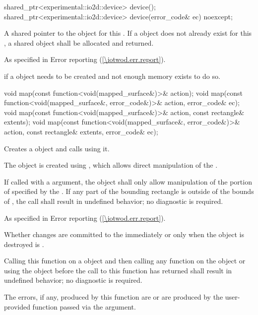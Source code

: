 \begin{itemdecl}
shared_ptr<experimental::io2d::device> device();
shared_ptr<experimental::io2d::device> device(error_code& ec) noexcept;
\end{itemdecl}
\begin{itemdescr}
\pnum
\returns
A shared pointer to the  object for this . If a  object does not already exist for this , a shared  object shall be allocated and returned.

\pnum
\throws
As specified in Error reporting (\ref{\iotwod.err.report}).

\pnum
\errors
{} if a  object needs to be created and not enough memory exists to do so.
\end{itemdescr}

\begin{itemdecl}
void map(const function<void(mapped_surface&)>& action);
void map(const function<void(mapped_surface&, error_code&)>& action, error_code& ec);
void map(const function<void(mapped_surface&)>& action, const rectangle& extents);
void map(const function<void(mapped_surface&, error_code&)>& action,
  const rectangle& extents, error_code& ec);
\end{itemdecl}
\begin{itemdescr}
\pnum
\effects
Creates a  object and calls  using it.

\pnum
The  object is created using , which allows direct manipulation of the \underlyingsurface.

\pnum
If called with a  argument, the  object shall only allow manipulation of the portion of  specified by the  . If any part of the bounding rectangle is outside of the bounds of , the call shall result in undefined behavior; no diagnostic is required.

\pnum
\throws
As specified in Error reporting (\ref{\iotwod.err.report}).

\pnum
\remarks
Whether changes are committed to the \underlyingsurface immediately or only when the  object is destroyed is \unspecnorm.

\pnum
Calling this function on a  object and then calling any function on the  object or using the  object before the call to this function has returned shall result in undefined behavior; no diagnostic is required.

\pnum
\errors
The errors, if any, produced by this function are  or are produced by the user-provided function passed via the  argument.
\end{itemdescr}

